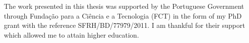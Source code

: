 \clearpage

\vspace*{\fill}
The work presented in this thesis was supported by the Portuguese Government through Fundação para a Ciência e a Tecnologia (FCT) in the form of my PhD grant with the reference SFRH/BD/77979/2011. I am thankful for their support which allowed me to attain higher education.
\vspace*{\fill}

\begin{center}
\end{center}
